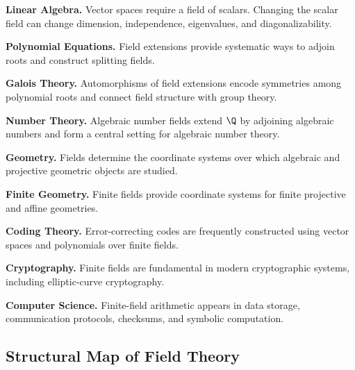 \begin{applicationbox}
\textbf{Linear Algebra.}
Vector spaces require a field of scalars. Changing the scalar field can change
dimension, independence, eigenvalues, and diagonalizability.

\medskip

\textbf{Polynomial Equations.}
Field extensions provide systematic ways to adjoin roots and construct
splitting fields.

\medskip

\textbf{Galois Theory.}
Automorphisms of field extensions encode symmetries among polynomial roots
and connect field structure with group theory.

\medskip

\textbf{Number Theory.}
Algebraic number fields extend \(\Q\) by adjoining algebraic numbers and form
a central setting for algebraic number theory.

\medskip

\textbf{Geometry.}
Fields determine the coordinate systems over which algebraic and projective
geometric objects are studied.

\medskip

\textbf{Finite Geometry.}
Finite fields provide coordinate systems for finite projective and affine
geometries.

\medskip

\textbf{Coding Theory.}
Error-correcting codes are frequently constructed using vector spaces and
polynomials over finite fields.

\medskip

\textbf{Cryptography.}
Finite fields are fundamental in modern cryptographic systems, including
elliptic-curve cryptography.

\medskip

\textbf{Computer Science.}
Finite-field arithmetic appears in data storage, communication protocols,
checksums, and symbolic computation.
\end{applicationbox}

\subsection{Structural Map of Field Theory}
\label{subsec:field-theory-structure-map}

